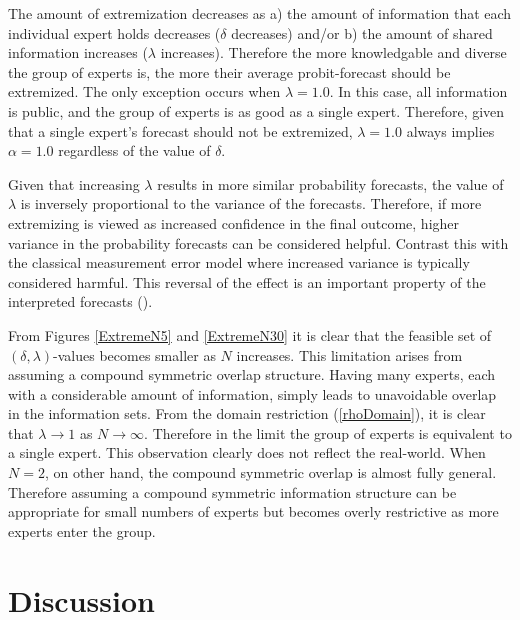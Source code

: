 \documentclass[11pt,twoside]{article}
\theoremstyle{definition}
\theoremstyle{definition}
\begin{document}
 

The amount of extremization decreases as a) the amount of information that each individual expert holds decreases ($\delta$ decreases) and/or b) the amount of shared information increases ($\lambda$ increases). Therefore the more knowledgable and diverse the group of experts is, the more their average probit-forecast should be extremized. The only exception occurs when $\lambda = 1.0$. In this case, all information is public, and the group of experts is as good as a single expert. Therefore, given that a single expert's forecast should not be extremized, $\lambda = 1.0$ always implies $\alpha = 1.0$ regardless of the value of $\delta$. 


Given that increasing $\lambda$ results in more similar probability forecasts, the value of $\lambda$ is inversely proportional to the variance of the forecasts. Therefore, if more extremizing is viewed as increased confidence in the final outcome, higher variance in the probability forecasts can be considered helpful. Contrast this with the classical measurement error model where increased variance is typically considered harmful. This reversal of the effect is an important property of the interpreted forecasts (\cite{hong2009interpreted}). 


From Figures \ref{ExtremeN5} and \ref{ExtremeN30} it is clear that the feasible set of $(\delta, \lambda)$-values becomes smaller as $N$ increases. This limitation arises from assuming a compound symmetric overlap structure. Having many experts, each with a considerable amount of information, simply leads to unavoidable overlap in the information sets. From the domain restriction (\ref{rhoDomain}), it is clear that $\lambda \to 1$ as $N \to \infty$. Therefore in the limit the group of experts is equivalent to a single expert. This observation clearly does not reflect the real-world. When $N = 2$, on other hand, the compound symmetric overlap is almost fully general. Therefore assuming a compound symmetric information structure can be appropriate for small numbers of experts but becomes overly restrictive as more experts enter the group. 


\section{Discussion}

\end{document}
